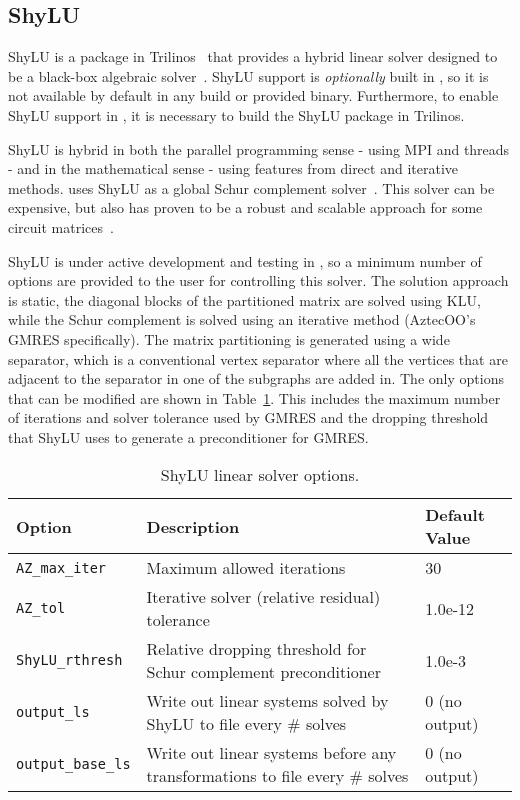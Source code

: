 \subsection{ShyLU}
\label{HybridLinearSolver_Options}
ShyLU is a package in Trilinos~\cite{trilinos:toms} that provides a hybrid linear solver 
designed to be a black-box algebraic solver~\cite{ShyLU-IPDPS}. 
ShyLU support is {\it optionally} built in \Xyce{},
so it is not available by default in any \Xyce{} build or provided binary.
Furthermore, to enable ShyLU support in \Xyce{}, it is necessary to build 
the ShyLU package in Trilinos.

ShyLU is hybrid in both the
parallel programming sense - using MPI and threads - and in the mathematical
sense - using features from direct and iterative methods. \Xyce{} uses ShyLU as a global
Schur complement solver~\cite{Saad:2003:IMSLS}.  This solver can be expensive, but also
has proven to be a robust and scalable approach for some circuit matrices~\cite{bomhof00}. 

ShyLU is under active development and testing in \Xyce{}, so a minimum number of options are 
provided to the user for controlling this solver.  The solution approach is static, 
the diagonal blocks of the partitioned matrix are solved using KLU, while the Schur complement 
is solved using an iterative method (AztecOO's GMRES specifically). 
The matrix partitioning is generated using a wide separator, which is a conventional 
vertex separator where all the vertices that are adjacent to the separator in one of the subgraphs
are added in.  The only options that can be modified are shown
in Table~\ref{tab:shylu:options}.  This includes the maximum number of iterations and solver tolerance
used by GMRES and the dropping threshold that ShyLU uses to generate a preconditioner for GMRES.

\begin{table}[htp]
\caption[ShyLU linear solver options.]{ShyLU linear solver options.}
\label{tab:shylu:options}
\begin{center}
\begin{tabular}{| p{3cm} | p{9cm} | p{2.5cm} |}
\hline
Option & Description & Default Value \\
\hline
{\tt AZ\_max\_iter}        & Maximum allowed iterations & 30 \\
{\tt AZ\_tol}              & Iterative solver (relative residual) tolerance & 1.0e-12 \\
{\tt ShyLU\_rthresh}       & Relative dropping threshold for Schur complement preconditioner & 1.0e-3 \\ 
{\tt output\_ls}           & Write out linear systems solved by ShyLU to file every \# solves & 0 (no output)\\
{\tt output\_base\_ls}     & Write out linear systems before any transformations to file every \# solves & 0 (no output)\\
\hline
\end{tabular}
\end{center}
\end{table}



